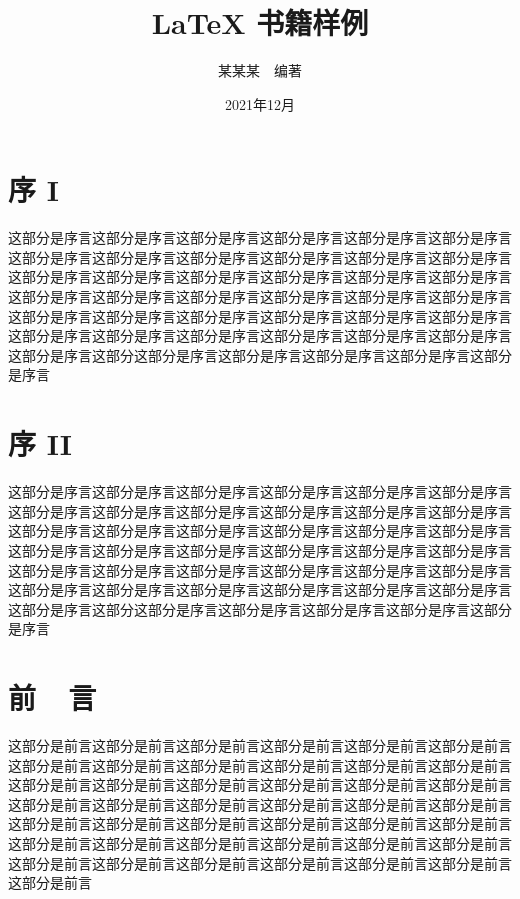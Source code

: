 \documentclass[UTF8,openany,twoside,12pt]{book}
\title{\bfseries LaTeX 书籍样例}
\author{\fangsong 某某某~~编著}
\date{\fangsong 2021年12月}
\theoremstyle{plain}
\begin{document}
\maketitle  %

\thispagestyle{empty}


\frontmatter   %




\chapter{序 I}

这部分是序言这部分是序言这部分是序言这部分是序言这部分是序言这部分是序言这部分是序言这部分是序言这部分是序言这部分是序言这部分是序言这部分是序言这部分是序言这部分是序言这部分是序言这部分是序言这部分是序言这部分是序言这部分是序言这部分是序言这部分是序言这部分是序言这部分是序言这部分是序言这部分是序言这部分是序言这部分是序言这部分是序言这部分是序言这部分是序言这部分是序言这部分是序言这部分是序言这部分是序言这部分是序言这部分是序言这部分是序言这部分这部分是序言这部分是序言这部分是序言这部分是序言这部分是序言


\chapter{序 II}

这部分是序言这部分是序言这部分是序言这部分是序言这部分是序言这部分是序言这部分是序言这部分是序言这部分是序言这部分是序言这部分是序言这部分是序言这部分是序言这部分是序言这部分是序言这部分是序言这部分是序言这部分是序言这部分是序言这部分是序言这部分是序言这部分是序言这部分是序言这部分是序言这部分是序言这部分是序言这部分是序言这部分是序言这部分是序言这部分是序言这部分是序言这部分是序言这部分是序言这部分是序言这部分是序言这部分是序言这部分是序言这部分这部分是序言这部分是序言这部分是序言这部分是序言这部分是序言

\chapter{前~~言}

这部分是前言这部分是前言这部分是前言这部分是前言这部分是前言这部分是前言这部分是前言这部分是前言这部分是前言这部分是前言这部分是前言这部分是前言这部分是前言这部分是前言这部分是前言这部分是前言这部分是前言这部分是前言这部分是前言这部分是前言这部分是前言这部分是前言这部分是前言这部分是前言这部分是前言这部分是前言这部分是前言这部分是前言这部分是前言这部分是前言这部分是前言这部分是前言这部分是前言这部分是前言这部分是前言这部分是前言这部分是前言这部分是前言这部分是前言这部分是前言这部分是前言这部分是前言这部分是前言
\end{document}
